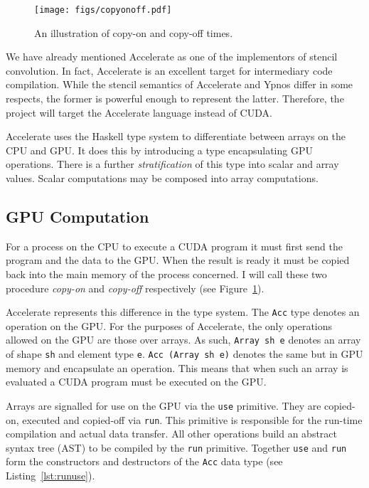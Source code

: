 \documentclass[
    12pt,
    a4paper,
    twoside,
    openright,
    ]{scrbook}
\begin{document}
\begin{figure}
  \texttt{[image: figs/copyonoff.pdf]}
  \caption{An illustration of copy-on and copy-off times.  }
  \label{fig:copyonoff}
\end{figure}

We have already mentioned Accelerate as one of the implementors of stencil
convolution. In fact, Accelerate is an excellent target for intermediary code
compilation. While the stencil semantics of Accelerate and Ypnos differ in some
respects, the former is powerful enough to represent the latter. Therefore, the
project will target the Accelerate language instead of CUDA.

Accelerate uses the Haskell type system to differentiate between arrays
on the CPU and GPU. It does this by introducing a type encapsulating GPU
operations. There is a further \emph{stratification} of this type into
scalar and array values. Scalar computations may be composed into
array computations.

\subsection{GPU Computation}

For a process on the CPU to execute a CUDA program it must first send
the program and the data to the GPU. When the result is ready it must be copied
back into the main memory of the process concerned. I will call these two
procedure \emph{copy-on} and \emph{copy-off} respectively (see
Figure~\ref{fig:copyonoff}).

Accelerate represents this difference in the type system. The \texttt{Acc} type
denotes an operation on the GPU. For the purposes of Accelerate, the only
operations allowed on the GPU are those over arrays. As such, \texttt{Array sh
  e} denotes an array of shape \texttt{sh} and element type \texttt{e}.
\texttt{Acc (Array sh e)} denotes the same but in GPU memory and encapsulate an
operation. This means that when such an array is evaluated a CUDA program must
be executed on the GPU.

Arrays are signalled for use on the GPU via the \texttt{use} primitive.  They
are copied-on, executed and copied-off via \texttt{run}. This primitive is
responsible for the run-time compilation and actual data transfer. All other
operations build an abstract syntax tree (AST) to be compiled by the
\texttt{run} primitive. Together \texttt{use} and \texttt{run} form the
constructors and destructors of the \texttt{Acc} data type (see
Listing~\ref{lst:runuse}).
\end{document}
